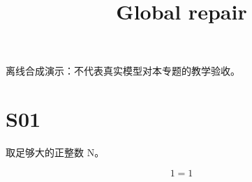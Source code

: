 \documentclass[UTF8,fontset=fandol,11pt]{ctexart}
\title{Global repair}
\date{}
\begin{document}
\maketitle
\par\noindent 离线合成演示：不代表真实模型对本专题的教学验收。\par
\section{S01}\label{sec:S01}
取足够大的正整数 N。\par
\[1=1\label{eq:old-unchecked}\]\par
\end{document}
